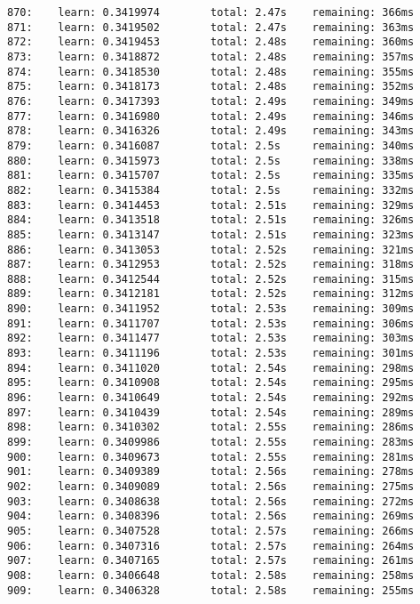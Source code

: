 \documentclass[11pt]{article}
\begin{document}
\begin{Verbatim}[commandchars=\\\{\}]
870:    learn: 0.3419974        total: 2.47s    remaining: 366ms
871:    learn: 0.3419502        total: 2.47s    remaining: 363ms
872:    learn: 0.3419453        total: 2.48s    remaining: 360ms
873:    learn: 0.3418872        total: 2.48s    remaining: 357ms
874:    learn: 0.3418530        total: 2.48s    remaining: 355ms
875:    learn: 0.3418173        total: 2.48s    remaining: 352ms
876:    learn: 0.3417393        total: 2.49s    remaining: 349ms
877:    learn: 0.3416980        total: 2.49s    remaining: 346ms
878:    learn: 0.3416326        total: 2.49s    remaining: 343ms
879:    learn: 0.3416087        total: 2.5s     remaining: 340ms
880:    learn: 0.3415973        total: 2.5s     remaining: 338ms
881:    learn: 0.3415707        total: 2.5s     remaining: 335ms
882:    learn: 0.3415384        total: 2.5s     remaining: 332ms
883:    learn: 0.3414453        total: 2.51s    remaining: 329ms
884:    learn: 0.3413518        total: 2.51s    remaining: 326ms
885:    learn: 0.3413147        total: 2.51s    remaining: 323ms
886:    learn: 0.3413053        total: 2.52s    remaining: 321ms
887:    learn: 0.3412953        total: 2.52s    remaining: 318ms
888:    learn: 0.3412544        total: 2.52s    remaining: 315ms
889:    learn: 0.3412181        total: 2.52s    remaining: 312ms
890:    learn: 0.3411952        total: 2.53s    remaining: 309ms
891:    learn: 0.3411707        total: 2.53s    remaining: 306ms
892:    learn: 0.3411477        total: 2.53s    remaining: 303ms
893:    learn: 0.3411196        total: 2.53s    remaining: 301ms
894:    learn: 0.3411020        total: 2.54s    remaining: 298ms
895:    learn: 0.3410908        total: 2.54s    remaining: 295ms
896:    learn: 0.3410649        total: 2.54s    remaining: 292ms
897:    learn: 0.3410439        total: 2.54s    remaining: 289ms
898:    learn: 0.3410302        total: 2.55s    remaining: 286ms
899:    learn: 0.3409986        total: 2.55s    remaining: 283ms
900:    learn: 0.3409673        total: 2.55s    remaining: 281ms
901:    learn: 0.3409389        total: 2.56s    remaining: 278ms
902:    learn: 0.3409089        total: 2.56s    remaining: 275ms
903:    learn: 0.3408638        total: 2.56s    remaining: 272ms
904:    learn: 0.3408396        total: 2.56s    remaining: 269ms
905:    learn: 0.3407528        total: 2.57s    remaining: 266ms
906:    learn: 0.3407316        total: 2.57s    remaining: 264ms
907:    learn: 0.3407165        total: 2.57s    remaining: 261ms
908:    learn: 0.3406648        total: 2.58s    remaining: 258ms
909:    learn: 0.3406328        total: 2.58s    remaining: 255ms

\end{Verbatim}
\end{document}
